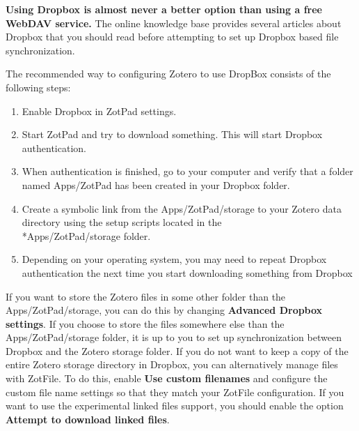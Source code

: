 \documentclass[oneside, openany, 12pt]{tufte-book}
\newcommand{\ipadfootnote}[1]{}
\newcommand{\ipadfootnote}[1]{\footnote{#1}}
\begin{document}
\textbf{Using Dropbox is almost never a better option than using a free WebDAV service\ipadfootnote{ZotPad recommends the free CloudMe service. \url{http://www.cloudme.com}}.} The online knowledge base provides several articles about Dropbox that you should read before attempting to set up Dropbox based file synchronization.

The recommended way to configuring Zotero to use DropBox consists of the following steps:

\begin{enumerate}
\item Enable Dropbox in ZotPad settings.
\item Start ZotPad and try to download something. This will start Dropbox authentication.
\item When authentication is finished, go to your computer and verify that a folder named Apps/ZotPad has been created in your Dropbox folder.
\item Create a symbolic link from the Apps/ZotPad/storage to your Zotero data directory using the setup scripts located in the\\*Apps/ZotPad/storage folder.
\item Depending on your operating system, you may need to repeat Dropbox authentication the next time you start downloading something from Dropbox
\end{enumerate}

If you want to store the Zotero files in some other folder than the Apps/ZotPad/storage, you can do this by changing \textbf{Advanced Dropbox settings}. If you choose to store the files somewhere else than the Apps/ZotPad/storage folder, it is up to you to set up synchronization between Dropbox and the Zotero storage folder\ipadfootnote{Although it is possible to put the entire Zotero data directory inside Dropbox, this is not recommended. Doing so will cause your database and its journal file to be synchronized to Dropbox cloud. This will create a large amount of unnecessary network traffic. Additionally, if you use Zotero on two different computers with this setup, there is a high risk of corrupting your Zotero database.}. If you do not want to keep a copy of the entire Zotero storage directory in Dropbox, you can alternatively manage files with ZotFile. To do this, enable \textbf{Use custom filenames} and configure the custom file name settings so that they match your ZotFile configuration. If you want to use the experimental linked files support, you should enable the option \textbf{Attempt to download linked files}.
\end{document}
